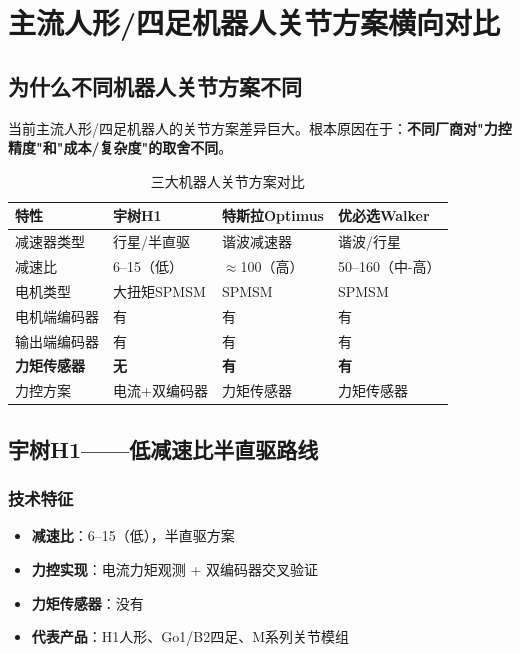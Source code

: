 \chapter{主流人形/四足机器人关节方案横向对比}
\label{ch:comparison}

\section{为什么不同机器人关节方案不同}

当前主流人形/四足机器人的关节方案差异巨大。根本原因在于：\textbf{不同厂商对"力控精度"和"成本/复杂度"的取舍不同}。

\begin{table}[H]
\centering
\begin{tabular}{lp{3cm}p{3cm}p{3cm}}
\toprule
\textbf{特性} & \textbf{宇树H1} & \textbf{特斯拉Optimus} & \textbf{优必选Walker} \\
\midrule
减速器类型 & 行星/半直驱 & 谐波减速器 & 谐波/行星 \\
减速比 & 6--15（低） & $\approx$100（高） & 50--160（中-高） \\
电机类型 & 大扭矩SPMSM & SPMSM & SPMSM \\
电机端编码器 & 有 & 有 & 有 \\
输出端编码器 & 有 & 有 & 有 \\
\textbf{力矩传感器} & \textbf{无} & \textbf{有} & \textbf{有} \\
力控方案 & 电流+双编码器 & 力矩传感器 & 力矩传感器 \\
\bottomrule
\end{tabular}
\caption{三大机器人关节方案对比}
\label{tab:robot_comparison}
\end{table}

\section{宇树H1——低减速比半直驱路线}

\subsection{技术特征}

\begin{itemize}
  \item \textbf{减速比}：6--15（低），半直驱方案
  \item \textbf{力控实现}：电流力矩观测 + 双编码器交叉验证
  \item \textbf{力矩传感器}：没有
  \item \textbf{代表产品}：H1人形、Go1/B2四足、M系列关节模组
\end{itemize}

